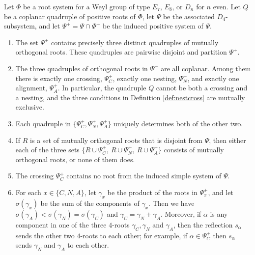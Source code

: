 \documentclass[10pt,a4paper]{amsart}
\newcommand{\allroots}{\Phi}
\newcommand{\al}{\alpha}
\newcommand{\coplanar}{coplanar\xspace}
\newcommand{\posroots}{\Phi^+}
\begin{document}
\begin{theorem}\label{thm:cna}
Let $\allroots$ be a root system for a Weyl group of type $E_7$, $E_8$, or $D_n$
for $n$ even.  Let $Q$ be a \coplanar quadruple of positive roots of
$\allroots$, let $\Psi$ be the associated $D_4$-subsystem, and let $\Psi^+ =
\Psi \cap \posroots$ be the induced positive system of $\Psi$.
\begin{enumerate}
\item[{\rm (i)}]
The set $\Psi^+$ contains precisely three distinct quadruples of mutually
orthogonal roots. These quadruples are pairwise disjoint and partition $\Psi^+$.

\item[{\rm (ii)}]
The three quadruples of orthogonal roots in $\Psi^+$  are all coplanar. Among
them there is exactly one crossing, $\Psi^+_C$, exactly one nesting, $\Psi^+_N$,
and exactly one alignment, $\Psi^+_A$. In particular, the quadruple $Q$ cannot
be both a crossing and a nesting, and the three conditions in Definition
\ref{def:nestcross} are mutually exclusive.

\item[{\rm (iii)}]
Each quadruple in $\{\Psi^+_C,\Psi^+_N, \Psi^+_A\}$ uniquely determines both of
the other two.

\item[{\rm (iv)}]
{If $R$ is a set of mutually orthogonal roots that is disjoint from $\Psi$, then
either each of the three sets $\{R \cup \Psi^+_C, \ R \cup \Psi^+_N, \ R \cup
\Psi^+_A\}$ consists of mutually orthogonal roots, or none of them does.}

\item[{\rm (v)}]
The crossing $\Psi^+_C$ contains no root from the induced simple system of
$\Psi$.

\item[{\rm (vi)}]
For each $x\in \{C,N,A\}$, let $\gamma_x$ be the product of the roots in
$\Psi^+_x$, and let $\sigma(\gamma_x)$ be the sum of the components of $\gamma_x$. Then we have $\sigma(\gamma_A) < \sigma(\gamma_N) =
\sigma(\gamma_C)$ and $\gamma_C = \gamma_N + \gamma_A.$ Moreover, if $\al$ is
any component in one of the three $4$-roots $\gamma_C,\gamma_N$ and $\gamma_A$,
then the reflection $s_\al$ sends the other two $4$-roots to each other; for
example, if $\al\in \Psi^+_C$ then $s_\al$ sends $\gamma_N$ and $\gamma_A$ to
each other.
\end{enumerate}
\end{theorem}
\end{document}
